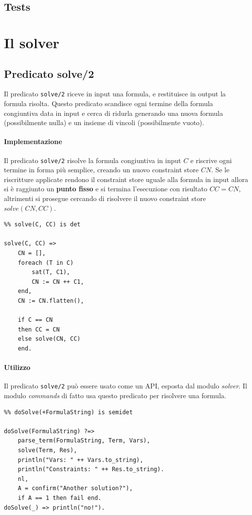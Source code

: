 \documentclass[12pt,a4paper,openright]{book} %
\begin{document}
\subsection{Tests}

\section{Il solver}

\subsection{Predicato solve/2}

Il predicato \verb|solve/2| riceve in input una formula, e restituisce in output la formula risolta. Questo predicato scandisce ogni termine della formula congiuntiva data in input e cerca di ridurla generando una nuova formula (possibilmente nulla) e un insieme di vincoli (possibilmente vuoto).

\paragraph{Implementazione} Il predicato \verb|solve/2| risolve la formula congiuntiva in input $C$ e riscrive ogni termine in forma più semplice, creando un nuovo constraint store $CN$. Se le riscritture applicate rendono il constraint store uguale alla formula in input allora si è raggiunto un \textbf{punto fisso} e si termina l'esecuzione con risultato $CC = CN$, altrimenti si prosegue cercando di risolvere il nuovo constraint store $solve(CN, CC)$.
\begin{verbatim}
%% solve(C, CC) is det

solve(C, CC) =>
    CN = [],
    foreach (T in C)
        sat(T, C1), 
        CN := CN ++ C1,
    end,
    CN := CN.flatten(),
   
    if C == CN 
    then CC = CN 
    else solve(CN, CC)
    end.
\end{verbatim}

\paragraph{Utilizzo} Il predicato \verb|solve/2| può essere usato come un API, esposta dal modulo \emph{solver}. Il modulo \emph{commands} di fatto usa questo predicato per risolvere una formula.
\begin{verbatim}
%% doSolve(+FormulaString) is semidet

doSolve(FormulaString) ?=>
    parse_term(FormulaString, Term, Vars),
    solve(Term, Res),
    println("Vars: " ++ Vars.to_string),
    println("Constraints: " ++ Res.to_string).
    nl,
    A = confirm("Another solution?"),
    if A == 1 then fail end.
doSolve(_) => println("no!").
\end{verbatim}
\end{document}
